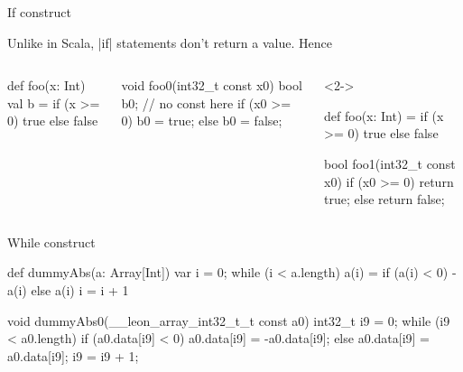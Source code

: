 \documentclass[10pt, compress, xcolor={usenames,dvipsnames}]{beamer}
\newcommand{\light}{\color{TealBlue}}
\begin{document}
\begin{frame}[fragile]{If construct}

  Unlike in Scala, |if| statements don't {\light return} a value. Hence

  \begin{columns}[T]
      \begin{Scala}
def foo(x: Int) {
  val b =
    if (x >= 0) true else false
}
      \end{Scala}

      \vspace{-2em}
      \vspace{-0.5em}

      \begin{C}
void foo0(int32_t const x0) {
  bool b0; // no const here
  if (x0 >= 0) { b0 = true; }
  else { b0 = false; }
}
      \end{C}

      \pause

      \begin{onlyenv}<2->

      \begin{Scala}
def foo(x: Int) =
  if (x >= 0) true else false
      \end{Scala}

      \vspace{0.5em}
      \vspace{-0.5em}

      \begin{C}
bool foo1(int32_t const x0) {
  if (x0 >= 0) { return true; }
  else { return false; }
}
      \end{C}

      \end{onlyenv}

  \end{columns}

\end{frame}


\begin{frame}[fragile]{While construct}

  \begin{Scala}
def dummyAbs(a: Array[Int]) {
  var i = 0;
  while (i < a.length) {
    a(i) = if (a(i) < 0) -a(i) else a(i)
    i = i + 1
  }
}
  \end{Scala}

  \pause

  \vspace{-2.5em}
  \vspace{-0.5em}

  \begin{C}
void dummyAbs0(__leon_array_int32_t_t const a0) {
  int32_t i9 = 0;
  while (i9 < a0.length) {
    if (a0.data[i9] < 0) { a0.data[i9] = -a0.data[i9]; }
    else { a0.data[i9] = a0.data[i9]; }
    i9 = i9 + 1;
  }
}
  \end{C}

\end{frame}
\end{document}
